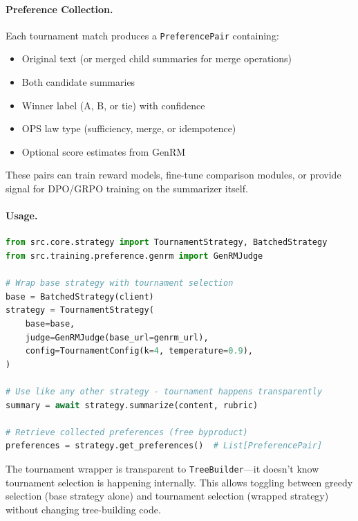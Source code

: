 \paragraph{Preference Collection.}
Each tournament match produces a \texttt{PreferencePair} containing:
\begin{itemize}[nosep]
    \item Original text (or merged child summaries for merge operations)
    \item Both candidate summaries
    \item Winner label (A, B, or tie) with confidence
    \item OPS law type (sufficiency, merge, or idempotence)
    \item Optional score estimates from GenRM
\end{itemize}

These pairs can train reward models, fine-tune comparison modules, or provide signal for DPO/GRPO training on the summarizer itself.

\paragraph{Usage.}
\begin{lstlisting}[language=Python]
from src.core.strategy import TournamentStrategy, BatchedStrategy
from src.training.preference.genrm import GenRMJudge

# Wrap base strategy with tournament selection
base = BatchedStrategy(client)
strategy = TournamentStrategy(
    base=base,
    judge=GenRMJudge(base_url=genrm_url),
    config=TournamentConfig(k=4, temperature=0.9),
)

# Use like any other strategy - tournament happens transparently
summary = await strategy.summarize(content, rubric)

# Retrieve collected preferences (free byproduct)
preferences = strategy.get_preferences()  # List[PreferencePair]
\end{lstlisting}

The tournament wrapper is transparent to \texttt{TreeBuilder}---it doesn't know tournament selection is happening internally. This allows toggling between greedy selection (base strategy alone) and tournament selection (wrapped strategy) without changing tree-building code.
